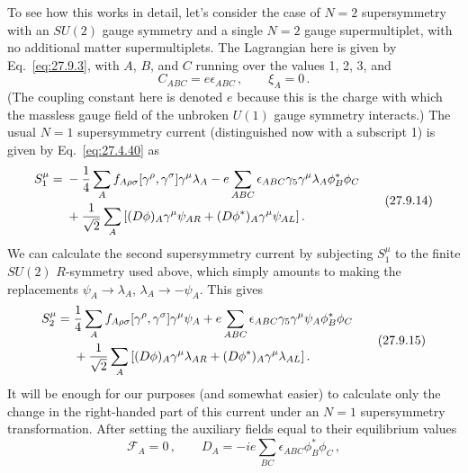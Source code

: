 To see how this works in detail, let's consider the case of \(N=2\)
supersymmetry with an \(SU(2)\) gauge symmetry and a single \(N=2\) gauge
supermultiplet, with no additional matter supermultiplets. The Lagrangian here
is given by Eq.~\eqref{eq:27.9.3}, with \(A\), \(B\), and \(C\) running over
the values 1, 2, 3, and
\begin{equation}
  C_{ABC}=e\epsilon_{ABC}\,,
  \qquad
  \xi_A=0\,.
  \tag{27.9.13}\label{eq:27.9.13}
\end{equation}
(The coupling constant here is denoted \(e\) because this is the charge with
which the massless gauge field of the unbroken \(U(1)\) gauge symmetry
interacts.) The usual \(N=1\) supersymmetry current (distinguished now with a
subscript 1) is given by Eq.~\eqref{eq:27.4.40} as
\begin{equation}
  \begin{aligned}
  S_1^\mu={}&
  -\frac14\sum_A f_{A\rho\sigma}
    [\gamma^\rho,\gamma^\sigma]\gamma^\mu\lambda_A
  -e\sum_{ABC}\epsilon_{ABC}\gamma_5\gamma^\mu
    \lambda_A\phi_B^*\phi_C
  \\
  &+\frac{1}{\sqrt{2}}\sum_A
    \left[
      (\sl{D}\phi)_A\gamma^\mu\psi_{AR}
      +(\sl{D}\phi^*)_A\gamma^\mu\psi_{AL}
    \right].
  \end{aligned}
  \tag{27.9.14}\label{eq:27.9.14}
\end{equation}
We can calculate the second supersymmetry current by subjecting \(S_1^\mu\)
to the finite \(SU(2)\) \(R\)-symmetry used above, which simply amounts to
making the replacements
\(\psi_A\longrightarrow\lambda_A\),
\(\lambda_A\longrightarrow-\psi_A\). This gives
\begin{equation}
  \begin{aligned}
  S_2^\mu={}&
  \frac14\sum_A f_{A\rho\sigma}
    [\gamma^\rho,\gamma^\sigma]\gamma^\mu\psi_A
  +e\sum_{ABC}\epsilon_{ABC}\gamma_5\gamma^\mu
    \psi_A\phi_B^*\phi_C
  \\
  &+\frac{1}{\sqrt{2}}\sum_A
    \left[
      (\sl{D}\phi)_A\gamma^\mu\lambda_{AR}
      +(\sl{D}\phi^*)_A\gamma^\mu\lambda_{AL}
    \right].
  \end{aligned}
  \tag{27.9.15}\label{eq:27.9.15}
\end{equation}
It will be enough for our purposes (and somewhat easier) to calculate only
the change in the right-handed part of this current under an \(N=1\)
supersymmetry transformation. After setting the auxiliary fields equal to
their equilibrium values
\[
  \mathcal{F}_A=0\,,
  \qquad
  D_A=-ie\sum_{BC}\epsilon_{ABC}\phi_B^*\phi_C\,,
\]
